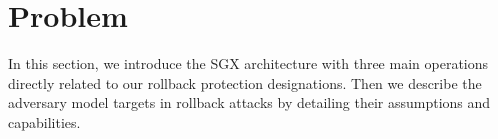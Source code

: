 \section{Problem}
\label{problem}
In this section, we introduce the SGX architecture with three main operations directly related to our rollback protection designations. Then we describe the adversary model targets in rollback attacks by detailing their assumptions and capabilities.





